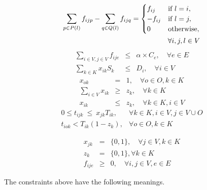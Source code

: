 {%
\begin{eqnarray}
 \sum_{p \in P(l)} f_{ijp} - \sum_{q \in Q(l)}  f_{ijq}  =  \begin{cases}  f_{ij} & \text{if } l=i,  \notag \\
   -f_{ij}  &   \text{if } l=j,  \notag \\
0 & \text{otherwise}, \end{cases}\\
\forall i,j,l \in V  \label{eq:flow3}
\end{eqnarray}
\begin{eqnarray}
 \sum_{i \in V, j \in V} f_{ije} &\leq& \alpha \times C_e, \quad \forall e \in E \label{eq:mlu4} \\
 \sum_{k \in K}  x_{ik}S_k &\leq& D_i , \quad \forall i \in V \label{eq:disk5}
\end{eqnarray}
\begin{eqnarray}
x_{ok} &=& 1, \quad \forall o \in O,   k \in K \label{eq:disk501}\\
\sum_{i \in V}  x_{ik} &\geq& z_k, \quad \forall k \in K  \label{eq:disk6}\\
x_{ik} &\leq& z_k, \quad \forall k \in K, i \in V  \label{eq:disk601}
\end{eqnarray}
\begin{eqnarray}
0 \leq t_{ijk} \ \leq\  x_{jk} T_{ik}, & \forall k \in K,  i \in V, j \in V \cup O   \label{eq:flow7}\\
t_{iok} < T_{ik}(1 - z_k), & \forall o \in O,  k \in K   \label{eq:flow8}
\end{eqnarray}

\begin{eqnarray*}
x_{jk} &=& \{0,1\}, \quad \forall j \in V, k \in K\\
z_{k} &=& \{0,1 \}, \forall k \in K\\
f_{ije} &\geq& 0, \quad \forall  i,j \in V, e \in E
\end{eqnarray*}



The constraints above have the following meanings.

}
